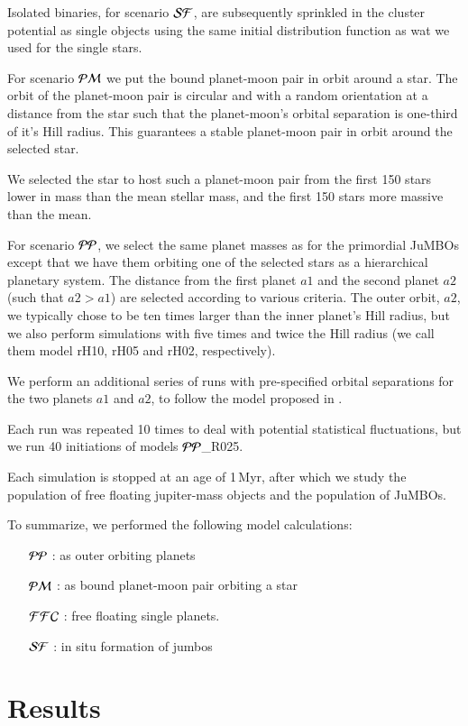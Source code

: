 \documentclass[aa]{lib/aa}
\newcommand{\jumbos}{\mbox{JuMBOs}}
\begin{document}
Isolated binaries, for scenario ${\cal SF}$, are subsequently sprinkled
in the cluster potential as single objects using the same initial
distribution function as wat we used for the single stars.

For scenario ${\cal PM}$ we put the bound planet-moon pair in orbit
around a star.  The orbit of the planet-moon pair is circular and with
a random orientation at a distance from the star such that the
planet-moon's orbital separation is one-third of it's Hill radius.
This guarantees a stable planet-moon pair in orbit around the selected
star.

We selected the star to host such a planet-moon pair from the first
150 stars lower in mass than the mean stellar mass, and the first 150
stars more massive than the mean.

For scenario ${\cal PP}$, we select the same planet masses as for the
primordial \jumbos\, except that we have them orbiting one of the
selected stars as a hierarchical planetary system. The distance from
the first planet $a1$ and the second planet $a2$ (such that $a2>a1$)
are selected according to various criteria. The outer orbit, $a2$, we
typically chose to be ten times larger than the inner planet's Hill
radius, but we also perform simulations with five times and twice the
Hill radius (we call them model rH10, rH05 and rH02, respectively).

We perform an additional series of runs with pre-specified orbital
separations for the two planets $a1$ and $a2$, to follow the model
proposed in \cite{2023arXiv231006016W}.

Each run was repeated 10 times to deal with potential statistical
fluctuations, but we run 40 initiations of models ${\cal PP}$\_R025.

Each simulation is stopped at an age of 1\,Myr, after which we study
the population of free floating jupiter-mass objects and the
population of \jumbos.

To summarize, we performed the following model calculations:
\begin{itemize}
\item[${\cal PP}$]: as outer orbiting planets
\item[${\cal PM}$]: as bound planet-moon pair orbiting a star
\item[${\cal FFC}$]: free floating single planets.
\item[${\cal SF}$]: in situ formation of jumbos
\end{itemize}

\section{Results}
\end{document}
